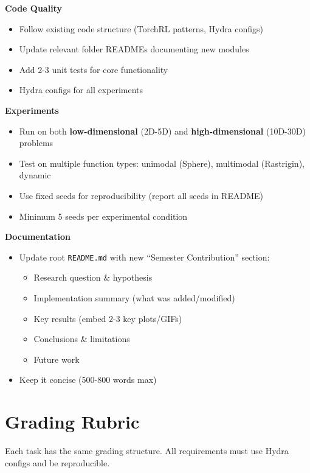 \documentclass[11pt,a4paper]{scrartcl}
\begin{document}
\begin{tcolorbox}[modern]
\textbf{Code Quality}
\begin{itemize}
    \item Follow existing code structure (TorchRL patterns, Hydra configs)
    \item Update relevant folder READMEs documenting new modules
    \item Add 2-3 unit tests for core functionality
    \item Hydra configs for all experiments
\end{itemize}

\textbf{Experiments}
\begin{itemize}
    \item Run on both \textbf{low-dimensional} (2D-5D) and \textbf{high-dimensional} (10D-30D) problems
    \item Test on multiple function types: unimodal (Sphere), multimodal (Rastrigin), dynamic
    \item Use fixed seeds for reproducibility (report all seeds in README)
    \item Minimum 5 seeds per experimental condition
\end{itemize}

\textbf{Documentation}
\begin{itemize}
    \item Update root \texttt{README.md} with new ``Semester Contribution'' section:
    \begin{itemize}
        \item Research question \& hypothesis
        \item Implementation summary (what was added/modified)
        \item Key results (embed 2-3 key plots/GIFs)
        \item Conclusions \& limitations
        \item Future work
    \end{itemize}
    \item Keep it concise (500-800 words max)
\end{itemize}
\end{tcolorbox}

\section*{Grading Rubric}

\begin{tcolorbox}[modern, title=\ttfamily\textbf{Total: 100 points}]
Each task has the same grading structure. All requirements must use Hydra configs and be reproducible.
\end{tcolorbox}
\end{document}
